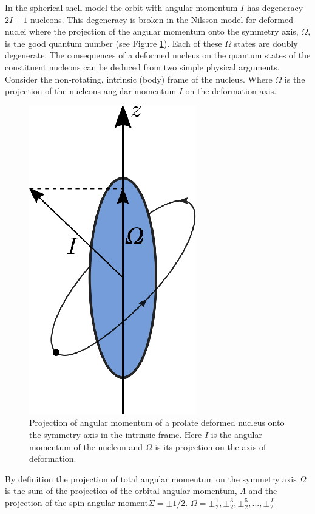 \documentclass[10pt,a4paper, twoside]{report}
\begin{document}
  In the spherical shell model the orbit with angular momentum $I$ has degeneracy $2I + 1$ nucleons. This degeneracy is broken in the Nilsson model for deformed nuclei where the projection of the angular momentum onto the symmetry axis, $\Omega$, is the good quantum number (see Figure \ref{fig:prolate_AM}). Each of these $\Omega$ states are doubly degenerate. The consequences of a deformed nucleus on the quantum states of the constituent nucleons can be deduced from two simple physical arguments. Consider the non-rotating, intrinsic (body) frame of the nucleus. Where $\Omega$ is the projection of the nucleons angular momentum $I$ on the deformation axis. 
\begin{figure}
\centering
\includegraphics[scale=1]{./figures/prolate_AM.eps}
\caption[Angular moment projections in deformed nuclei]{Projection of angular momentum of a prolate deformed nucleus onto the symmetry axis in the intrinsic frame. Here $I$ is the angular momentum of the nucleon and $\Omega$ is its projection on the axis of deformation.}
\label{fig:prolate_AM}
\end{figure}
By definition the projection of total angular momentum on the symmetry axis $\Omega$ is the sum of the projection of the orbital angular momentum, $\Lambda$ and the projection of the spin angular moment$\Sigma = \pm 1/2$.  $\Omega = \pm\tfrac{1}{2}, \pm\tfrac{3}{2},  \pm\tfrac{5}{2},  ... ,  \pm\tfrac{I}{2}$
\end{document}
